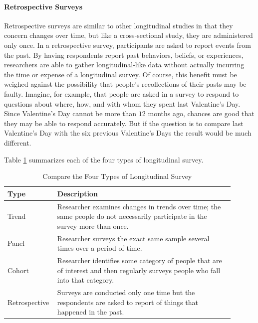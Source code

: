 \paragraph{Retrospective Surveys}

Retrospective surveys are similar to other longitudinal studies in that they concern changes over time, but like a cross-sectional study, they are administered only once. In a retrospective survey, participants are asked to report events from the past. By having respondents report past behaviors, beliefs, or experiences, researchers are able to gather longitudinal-like data without actually incurring the time or expense of a longitudinal survey. Of course, this benefit must be weighed against the possibility that people's recollections of their pasts may be faulty. Imagine, for example, that people are asked in a survey to respond to questions about where, how, and with whom they spent last Valentine's Day. Since Valentine's Day cannot be more than $ 12 $ months ago, chances are good that they may be able to respond accurately. But if the question is to compare last Valentine's Day with the six previous Valentine's Days the result would be much different.

Table \ref{tab08.01} summarizes each of the four types of longitudinal survey.

\begin{table}[H]
	\centering
	\begin{tabularx}{0.95\linewidth}{p{0.15\linewidth}p{0.75\linewidth}}
		\toprule
		\textbf{Type} & \textbf{Description} \\
		\midrule
		Trend & Researcher examines changes in trends over time; the same people do not necessarily participate in the survey more than once. \\
		Panel & Researcher surveys the exact same sample several times over a period of time. \\
		Cohort & Researcher identifies some category of people that are of interest and then regularly surveys people who fall into that category.\\
		Retrospective & Surveys are conducted only one time but the respondents are asked to report of things that happened in the past.\\		
		\bottomrule
	\end{tabularx}
	\caption{Compare the Four Types of Longitudinal Survey}
	\label{tab08.01}
\end{table}


